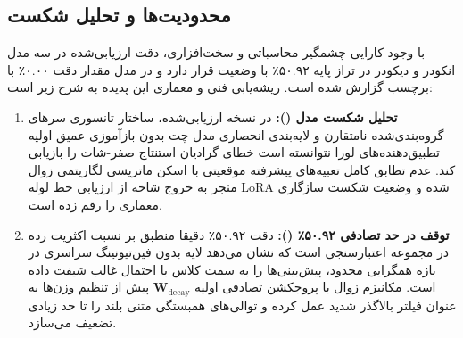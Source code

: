 \subsection{محدودیت‌ها و تحلیل شکست}
با وجود کارایی چشمگیر محاسباتی و سخت‌افزاری، دقت ارزیابی‌شده در سه مدل انکودر و دیکودر در تراز پایه ۵۰.۹۲٪ با وضعیت  قرار دارد و در مدل  مقدار دقت ۰.۰۰٪ با برچسب  گزارش شده است. ریشه‌یابی فنی و معماری این پدیده به شرح زیر است:
\begin{enumerate}
    \item \textbf{تحلیل شکست مدل  ():} در نسخه ارزیابی‌شده، ساختار تانسوری سرهای گروه‌بندی‌شده نامتقارن  و لایه‌بندی انحصاری مدل چت  بدون بازآموزی عمیق اولیه تطبیق‌دهنده‌های لورا نتوانسته است خطای گرادیان استنتاج صفر-شات را بازیابی کند. عدم تطابق کامل تعبیه‌های پیشرفته موقعیتی  با اسکن ماتریسی لگاریتمی زوال منجر به خروج شاخه از ارزیابی خط لوله LoRA شده و وضعیت شکست سازگاری معماری را رقم زده است.
    \item \textbf{توقف در حد تصادفی ۵۰.۹۲٪ ():} دقت ۵۰.۹۲٪ دقیقا منطبق بر نسبت اکثریت رده در مجموعه اعتبارسنجی  است که نشان می‌دهد لایه بدون فین‌تیونینگ سراسری در بازه همگرایی محدود، پیش‌بینی‌ها را به سمت کلاس با احتمال غالب شیفت داده است. مکانیزم زوال با پروجکشن تصادفی اولیه $\mathbf{W}_{\text{decay}}$ پیش از تنظیم وزن‌ها به عنوان فیلتر بالاگذر شدید عمل کرده و توالی‌های همبستگی متنی بلند را تا حد زیادی تضعیف می‌سازد.
\end{enumerate}
